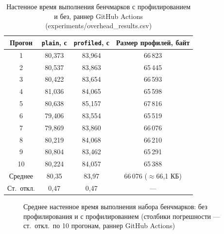 \documentclass[12pt,a4paper]{article}
\numberwithin{equation}{section}
\begin{document}
\begin{table}[htbp]
\caption{Настенное время выполнения бенчмарков с профилированием и без, раннер GitHub Actions (experiments/overhead\_results.csv)}
\label{tab:5.3}
\centering
\begin{tabular}{cccc}
\toprule
Прогон & \texttt{plain}, с & \texttt{profiled}, с & Размер профилей, байт \\
\midrule
1  & 80,373 & 83,964 & 66\,823 \\
2  & 80,537 & 83,863 & 65\,445 \\
3  & 80,422 & 83,654 & 66\,593 \\
4  & 81,036 & 84,065 & 65\,598 \\
5  & 80,638 & 85,157 & 67\,816 \\
6  & 79,406 & 83,554 & 65\,519 \\
7  & 79,869 & 83,860 & 66\,076 \\
8  & 80,219 & 84,068 & 66\,210 \\
9  & 80,804 & 83,462 & 65\,291 \\
10 & 80,224 & 84,057 & 65\,388 \\
\midrule
Среднее & 80,35 & 83,97 & 66\,076 ($\approx$66,1 КБ) \\
Ст.\ откл. & 0,47 & 0,47 & --- \\
\bottomrule
\end{tabular}
\end{table}

\begin{figure}[htbp]
\centering
{}
\caption{Среднее настенное время выполнения набора бенчмарков: без профилирования и с профилированием (столбики погрешности --- ст.\ откл.\ по 10 прогонам, раннер GitHub Actions)}
\label{fig:5.1}
\end{figure}
\end{document}
